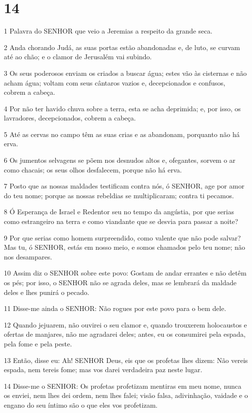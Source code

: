 \chapter{14}

\par 1 Palavra do SENHOR que veio a Jeremias a respeito da grande seca.
\par 2 Anda chorando Judá, as suas portas estão abandonadas e, de luto, se curvam até ao chão; e o clamor de Jerusalém vai subindo.
\par 3 Os seus poderosos enviam os criados a buscar água; estes vão às cisternas e não acham água; voltam com seus cântaros vazios e, decepcionados e confusos, cobrem a cabeça.
\par 4 Por não ter havido chuva sobre a terra, esta se acha deprimida; e, por isso, os lavradores, decepcionados, cobrem a cabeça.
\par 5 Até as cervas no campo têm as suas crias e as abandonam, porquanto não há erva.
\par 6 Os jumentos selvagens se põem nos desnudos altos e, ofegantes, sorvem o ar como chacais; os seus olhos desfalecem, porque não há erva.
\par 7 Posto que as nossas maldades testificam contra nós, ó SENHOR, age por amor do teu nome; porque as nossas rebeldias se multiplicaram; contra ti pecamos.
\par 8 Ó Esperança de Israel e Redentor seu no tempo da angústia, por que serias como estrangeiro na terra e como viandante que se desvia para passar a noite?
\par 9 Por que serias como homem surpreendido, como valente que não pode salvar? Mas tu, ó SENHOR, estás em nosso meio, e somos chamados pelo teu nome; não nos desampares.
\par 10 Assim diz o SENHOR sobre este povo: Gostam de andar errantes e não detêm os pés; por isso, o SENHOR não se agrada deles, mas se lembrará da maldade deles e lhes punirá o pecado.
\par 11 Disse-me ainda o SENHOR: Não rogues por este povo para o bem dele.
\par 12 Quando jejuarem, não ouvirei o seu clamor e, quando trouxerem holocaustos e ofertas de manjares, não me agradarei deles; antes, eu os consumirei pela espada, pela fome e pela peste.
\par 13 Então, disse eu: Ah! SENHOR Deus, eis que os profetas lhes dizem: Não vereis espada, nem tereis fome; mas vos darei verdadeira paz neste lugar.
\par 14 Disse-me o SENHOR: Os profetas profetizam mentiras em meu nome, nunca os enviei, nem lhes dei ordem, nem lhes falei; visão falsa, adivinhação, vaidade e o engano do seu íntimo são o que eles vos profetizam.
